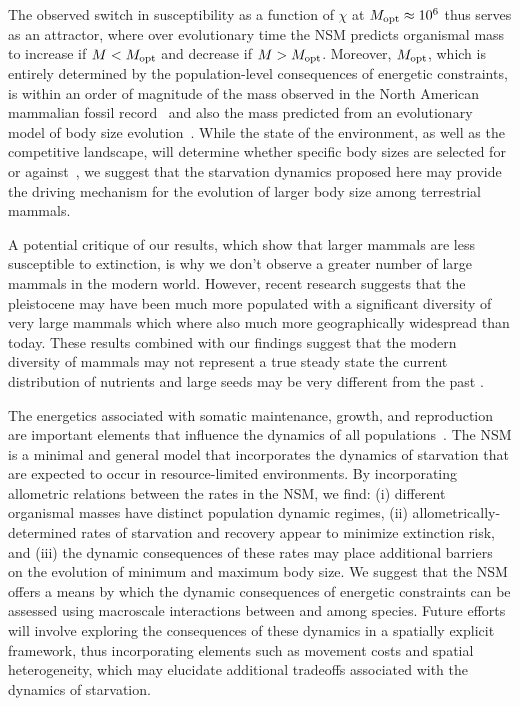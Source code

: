 \documentclass{pnastwo}
\begin{document}
\begin{article}
The observed switch in susceptibility as a function of $\chi$ at
$M_{\rm opt}\approx10^6$ thus serves as an attractor, where over evolutionary
time the NSM predicts organismal mass to increase if $M<M_{\rm opt}$ and
decrease if $M>M_{\rm opt}$.  Moreover, $M_{\rm opt}$, which is entirely
determined by the population-level consequences of energetic constraints, is
within an order of magnitude of the mass observed in the North American
mammalian fossil record~\cite{Alroy:1998p1594} and also the mass predicted
from an evolutionary model of body size evolution~\cite{Clauset:2009fh}.
While the state of the environment, as well as the competitive landscape,
will determine whether specific body sizes are selected for or
against~\cite{Saarinen:2014br}, we suggest that the starvation dynamics
proposed here may provide the driving mechanism for the evolution of larger
body size among terrestrial mammals.

A potential critique of our results, which show that larger mammals are less susceptible to extinction, is why we don't observe a greater number of large mammals in the modern world. However, recent research suggests that the pleistocene may have been much more populated with a significant diversity of very large mammals \cite{Doughty:2013kd,Doughty:2015hy,Doughty:2015je} which where also much more geographically widespread than today. These results combined with our findings suggest that the modern diversity of mammals may not represent a true steady state the current distribution of nutrients and large seeds may be very different from the past \cite{Doughty:2013kd,Doughty:2015hy,Doughty:2015je}. 

The energetics associated with somatic maintenance, growth, and reproduction
are important elements that influence the dynamics of all
populations~\cite{Stearns:1989ip}.  The NSM is a minimal and general model
that incorporates the dynamics of starvation that are expected to occur in
resource-limited environments.  By incorporating allometric relations between
the rates in the NSM, we find: (i) different organismal masses have distinct
population dynamic regimes, (ii) allometrically-determined rates of
starvation and recovery appear to minimize extinction risk, and (iii) the
dynamic consequences of these rates may place additional barriers on the
evolution of minimum and maximum body size.  We suggest that the NSM offers a
means by which the dynamic consequences of energetic constraints can be
assessed using macroscale interactions between and among species.  Future
efforts will involve exploring the consequences of these dynamics in a
spatially explicit framework, thus incorporating elements such as movement
costs and spatial heterogeneity, which may elucidate additional tradeoffs
associated with the dynamics of starvation.


\end{article}
\end{document}
